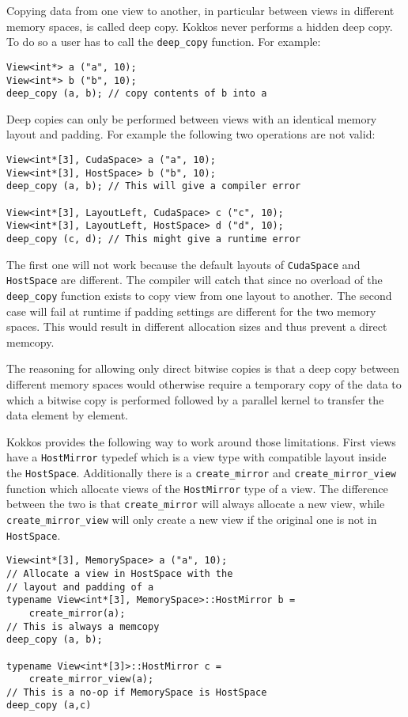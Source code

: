 Copying data from one view to another, in particular between views 
in different memory spaces, is called deep copy. 
Kokkos never performs a hidden deep copy. To do so a user has to 
call the \lstinline!deep_copy! function.  For example:
\begin{lstlisting}
View<int*> a ("a", 10);
View<int*> b ("b", 10);
deep_copy (a, b); // copy contents of b into a
\end{lstlisting}

Deep copies can only be performed between views with an identical 
memory layout and padding. For example the following two operations
are not valid:
\begin{lstlisting}
View<int*[3], CudaSpace> a ("a", 10);
View<int*[3], HostSpace> b ("b", 10);
deep_copy (a, b); // This will give a compiler error

View<int*[3], LayoutLeft, CudaSpace> c ("c", 10);
View<int*[3], LayoutLeft, HostSpace> d ("d", 10);
deep_copy (c, d); // This might give a runtime error
\end{lstlisting}

The first one will not work because the default layouts of \lstinline|CudaSpace|
and \lstinline|HostSpace| are different. The compiler will catch that since 
no overload of the \lstinline|deep_copy| function exists to copy view from
one layout to another. The second case will fail at runtime if padding settings
are different for the two memory spaces. This would result in different 
allocation sizes and thus prevent a direct memcopy. 

The reasoning for allowing only direct bitwise copies is that a deep copy
between different memory spaces would otherwise require a temporary 
copy of the data to which a bitwise copy is performed followed by a parallel
kernel to transfer the data element by element. 

Kokkos provides the following way to work around those limitations. 
First views have a \lstinline|HostMirror| typedef which is a view type with 
compatible layout inside the \lstinline|HostSpace|. Additionally there is a
\lstinline|create_mirror| and \lstinline|create_mirror_view| function which 
allocate views of the \lstinline|HostMirror| type of a view. 
The difference between the two is that \lstinline|create_mirror| will always
allocate a new view, while \lstinline|create_mirror_view| will only create a 
new view if the original one is not in \lstinline|HostSpace|.

\begin{lstlisting}
View<int*[3], MemorySpace> a ("a", 10);
// Allocate a view in HostSpace with the 
// layout and padding of a
typename View<int*[3], MemorySpace>::HostMirror b =
    create_mirror(a);
// This is always a memcopy
deep_copy (a, b); 

typename View<int*[3]>::HostMirror c =
    create_mirror_view(a);
// This is a no-op if MemorySpace is HostSpace
deep_copy (a,c)
\end{lstlisting}


